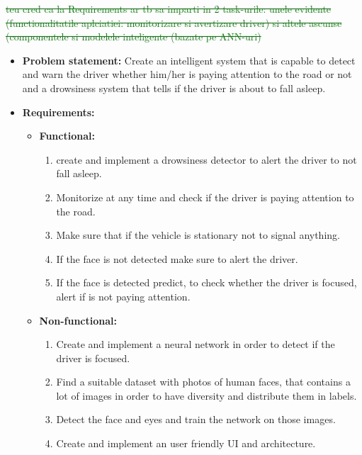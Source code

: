 \textcolor{green}{\sout{teu cred ca la Requirements ar tb sa imparti in 2 task-urile: unele evidente (functionalitatile aplciatiei: monitorizare si avertizare driver) si altele ascunse (componentele si modelele inteligente (bazate pe ANN-uri)}}

\begin{itemize}
    \item \textbf{Problem statement:} Create an intelligent system that is capable to detect and warn the driver whether him/her is paying attention to the road or not and a drowsiness system that tells if the driver is about to fall asleep.
    \item \textbf{Requirements:} 
        \begin{itemize}
            \item \textbf{Functional:} \begin{enumerate}
                \item create and implement a drowsiness detector to alert the driver to not fall asleep.
                \item Monitorize at any time and check if the driver is paying attention to the road.
                \item Make sure that if the vehicle is stationary not to signal anything.
                \item If the face is not detected make sure to alert the driver.
                \item If the face is detected predict, to check whether the driver is focused, alert if is not paying attention.
            \end{enumerate}
            \item \textbf{Non-functional:} \begin{enumerate}
                \item Create and implement a neural network in order to detect if the driver is focused.
                \item Find a suitable dataset with photos of human faces, that contains a lot of images in order to have diversity and distribute them in labels.
                \item Detect the face and eyes and train the network on those images.
                \item Create and implement an user friendly UI and architecture.
            \end{enumerate}
        \end{itemize}
\end{itemize}